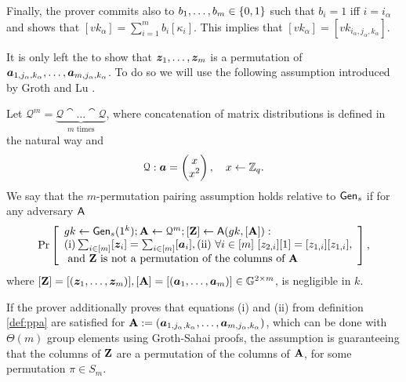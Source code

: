 Finally, the prover commits also to $b_1,\ldots,b_m\in\{0,1\}$ such that $b_i=1$ iff $i=i_\alpha$ and shows that $[vk_\alpha] = \sum_{i=1}^m b_i[\kappa_i]$. This implies that $[vk_\alpha] = [vk_{i_\alpha,j_\alpha,k_\alpha}]$.


It is only left the to show that ${\boldsymbol{z}}_1,\ldots,{\boldsymbol{z}}_m$ is a permutation of ${\boldsymbol{a}}_{1,j_\alpha,k_\alpha},\ldots,{\boldsymbol{a}}_{m,j_\alpha,k_\alpha}$. To do so we will use the following assumption introduced by Groth and Lu \cite{AC:GroLu07}.
\begin{definition}\label{def:ppa}
Let $\mathcal{Q}^{m}=\underbrace{\mathcal{Q}\cat\ldots\cat\mathcal{Q}}_{m\text{ times}}$, where concatenation of matrix distributions is defined in the natural way and 
$$\mathcal{Q}: {\boldsymbol{a}}=\left(\begin{matrix}x\\x^2\end{matrix}\right),\quad x\gets\mathbb{Z}_q.$$
We say that the $m$-permutation pairing assumption holds relative to $\mathsf{Gen}_s$ if for any adversary $\mathsf{A}$
$$
\Pr\left[
\begin{array}{l}
gk\gets\mathsf{Gen}_s(1^k);\mathbf{{A}}\gets\mathcal{Q}^{m};[\mathbf{{Z}}]\gets\mathsf{A}(gk,[\mathbf{{A}}]):\\
\mathrm{(i)} \sum_{i\in[m]}[{\boldsymbol{z}}_i]=\sum_{i\in[m]}[{\boldsymbol{a}}_i], \mathrm{(ii)}\ \forall i\in[m]\ [z_{2,i}][1]=[z_{1,i}][z_{1,i}],\\
\text{ and }\mathbf{{Z}}\text{ is not a permutation of the columns of }\mathbf{{A}}
\end{array}
\right],
$$
where $[\mathbf{{Z}}]=[({\boldsymbol{z}}_1,\ldots,{\boldsymbol{z}}_m)],[\mathbf{{A}}]=[({\boldsymbol{a}}_1,\ldots,{\boldsymbol{a}}_m)]\in\mathbb{G}^{2\times m}$,
is negligible in $k$.
\end{definition}

If the prover additionally proves that equations (i) and (ii) from definition \ref{def:ppa} are satisfied for $\mathbf{{A}}:=({\boldsymbol{a}}_{1,j_\alpha,k_\alpha},\ldots,{\boldsymbol{a}}_{m,j_\alpha,k_\alpha})$, which can be done with $\Theta(m)$ group elements using Groth-Sahai proofs, the assumption is guaranteeing that the columns of $\mathbf{{Z}}$ are a permutation of the columns of $\mathbf{{A}}$, for some permutation $\pi\in S_m$.

